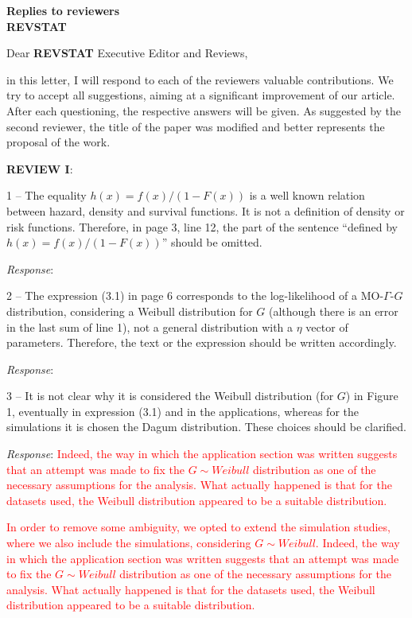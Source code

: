 \documentclass[version=last,12pt,{"/home/prdm0/R/x86_64-pc-linux-gnu-library/4.2/komaletter/rmarkdown/templates/pdf/resources/maintainersDelight"},letterpaper,]{scrlttr2}
\begin{document}
\begin{letter}{\textbf{Replies to reviewers}\\\textbf{REVSTAT}\\}
\opening{Dear \textbf{REVSTAT} Executive Editor and Reviews,}

in this letter, I will respond to each of the reviewers valuable
contributions. We try to accept all suggestions, aiming at a significant
improvement of our article. After each questioning, the respective
answers will be given. As suggested by the second reviewer, the title of
the paper was modified and better represents the proposal of the work.

\textbf{REVIEW I}:

1 -- The equality \(h(x)=f(x)/(1-F(x))\) is a well known relation
between hazard, density and survival functions. It is not a definition
of density or risk functions. Therefore, in page 3, line 12, the part of
the sentence ``defined by \(h(x)=f(x)/(1-F(x))\)'' should be omitted.

\emph{Response}:

2 -- The expression (3.1) in page 6 corresponds to the log-likelihood of
a MO-\(\Gamma\)-\(G\) distribution, considering a Weibull distribution
for \(G\) (although there is an error in the last sum of line 1), not a
general distribution with a \(\eta\) vector of parameters. Therefore,
the text or the expression should be written accordingly.

\emph{Response}:

3 -- It is not clear why it is considered the Weibull distribution (for
\(G\)) in Figure 1, eventually in expression (3.1) and in the
applications, whereas for the simulations it is chosen the Dagum
distribution. These choices should be clarified.

\emph{Response}:
\textcolor{red}{Indeed, the way in which the application section was written suggests that an attempt was made to fix the $G\sim Weibull$ distribution as one of the necessary assumptions for the analysis. What actually happened is that for the datasets used, the Weibull distribution appeared to be a suitable distribution.}

\textcolor{red}{In order to remove some ambiguity, we opted to extend the simulation studies, where we also include the simulations, considering $G\sim Weibull$.
Indeed, the way in which the application section was written suggests that an attempt was made to fix the $G\sim Weibull$ distribution as one of the necessary assumptions for the analysis. What actually happened is that for the datasets used, the Weibull distribution appeared to be a suitable distribution.}


\end{letter}
\end{document}
